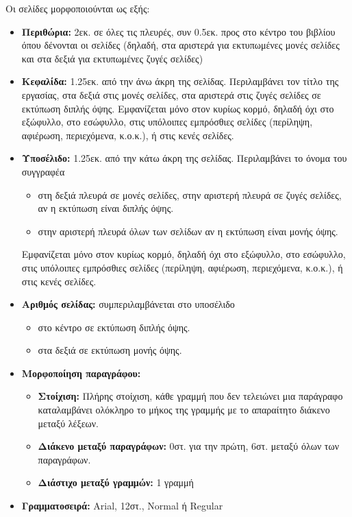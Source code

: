 \documentclass[inscr,ack,preface]{dimscthesis}
\begin{document}
Οι σελίδες μορφοποιούνται ως εξής:

\begin{itemize}
    \item \textbf{Περιθώρια:} 2εκ. σε όλες τις πλευρές, συν 0.5εκ. προς στο κέντρο του βιβλίου όπου δένονται οι σελίδες (δηλαδή, στα αριστερά για εκτυπωμένες μονές σελίδες και στα δεξιά για εκτυπωμένες ζυγές σελίδες)
    \item \textbf{Κεφαλίδα:} 1.25εκ. από την άνω άκρη της σελίδας.
    Περιλαμβάνει τον τίτλο της εργασίας, στα δεξιά στις μονές σελίδες, στα αριστερά στις ζυγές σελίδες σε εκτύπωση διπλής όψης.
    Εμφανίζεται μόνο στον κυρίως κορμό, δηλαδή όχι στο εξώφυλλο, στο εσώφυλλο, στις υπόλοιπες εμπρόσθιες σελίδες (περίληψη, αφιέρωση, περιεχόμενα, κ.ο.κ.), ή στις κενές σελίδες.
    \item \textbf{Υποσέλιδο:} 1.25εκ. από την κάτω άκρη της σελίδας.
    Περιλαμβάνει το όνομα του συγγραφέα
    \begin{itemize}
        \item στη δεξιά πλευρά σε μονές σελίδες, στην αριστερή πλευρά σε ζυγές σελίδες, αν η εκτύπωση είναι διπλής όψης.
        \item στην αριστερή πλευρά όλων των σελίδων αν η εκτύπωση είναι μονής όψης.
    \end{itemize}
    Εμφανίζεται μόνο στον κυρίως κορμό, δηλαδή όχι στο εξώφυλλο, στο εσώφυλλο, στις υπόλοιπες εμπρόσθιες σελίδες (περίληψη, αφιέρωση, περιεχόμενα, κ.ο.κ.), ή στις κενές σελίδες.
    \item \textbf{Αριθμός σελίδας:} συμπεριλαμβάνεται στο υποσέλιδο
    \begin{itemize}
        \item στο κέντρο σε εκτύπωση διπλής όψης.
        \item στα δεξιά σε εκτύπωση μονής όψης.
    \end{itemize}
    \item \textbf{Μορφοποίηση παραγράφου:}
    \begin{itemize}
        \item \textbf{Στοίχιση:} Πλήρης στοίχιση, κάθε γραμμή που δεν τελειώνει μια παράγραφο καταλαμβάνει ολόκληρο το μήκος της γραμμής με το απαραίτητο διάκενο μεταξύ λέξεων.
        \item \textbf{Διάκενο μεταξύ παραγράφων:} 0στ. για την πρώτη, 6στ. μεταξύ όλων των παραγράφων.
        \item \textbf{Διάστιχο μεταξύ γραμμών:} 1 γραμμή
    \end{itemize}
    \item \textbf{Γραμματοσειρά:} Arial, 12στ., Normal ή Regular

\end{itemize}
\end{document}
